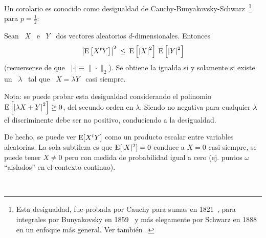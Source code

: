 Un       corolario       es       conocido       como       desigualdad       de
Cauchy-Bunyakovsky-Schwarz~\footnote{Esta  desigualdad, fue  probada  por Cauchy
  para  sumas   en  1821~\cite{Cau21},   para  integrales  por   Bunyakovsky  en
  1859~\cite{Bou59} y  m\'as elegamente por  Schwarz en 1888~\cite{Sch88}  en un
  enfoque m\'as general. Ver tambi\'en~\cite{Ste04}.} para $p = \frac12$:
%
\begin{corolario}
\label{Cor:MP:DesigualdadCauchySchwarz}
%
  Sean \  $X$ \ e \  $Y$ \ dos vectores  aleatorios $d$-dimensionales. Entonces
  \[
  \left|  \operatorname{E}\left[  X^t Y  \right]  \right|^2 \:  \le  \:  \operatorname{E}\left[ \left|  X
    \right|^2   \right]  \:  \operatorname{E}\left[   \left|  Y
    \right|^2 \right]
  \]
  (recuersense de que \ $|\cdot| \equiv  \| \cdot \|_2$).  Se obtiene la igualda
  si y  solamente si existe un \  $\lambda$ \ tal que  \ $X = \lambda  Y$ \ casi
  siempre.
\end{corolario}
%
Nota:  se puede probar  esta desigualdad  considerando el  polinomio $\operatorname{E}\left[
  \left|  \lambda  X  +  Y  \right|^2  \right] \ge  0$,  del  secundo  orden  en
$\lambda$. Siendo no negativa para cualquier $\lambda$ el discriminente debe ser
no positivo, conduciendo a la desigualdad.

De hecho,  se puede ver $\operatorname{E}[X^t  Y]$ como un producto  escalar entre variables
aleatorias. La sola  subtileza es que $\operatorname{E}[|X|^2]  = 0$ conduce a $X  = 0$ casi
siempre, \ie se  puede tener $X \ne  0$ pero con medida de  probabilidad igual a
cero (ej. puntos $\omega$ ``aislados'' en el contexto continuo).


\hspace{1cm} %


\

